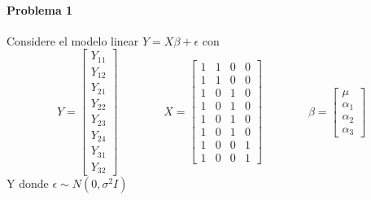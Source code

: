 \documentclass[12pt,a4paper]{report}
\author{Guadalupe Monroy}
\begin{document}



\paragraph{Problema 1} Considere el modelo linear $Y = X\beta + \epsilon$ con
$$ Y=\begin{bmatrix} Y_{11} \\ 
Y_{12} \\ Y_{21} \\ Y_{22} \\ Y_{23} \\ Y_{24} \\ Y_{31} \\ Y_{32}
\end{bmatrix} \qquad \qquad
X=\begin{bmatrix}
1 & 1 & 0 & 0 \\
1 & 1 & 0 & 0 \\
1 & 0 & 1 & 0 \\
1 & 0 & 1 & 0 \\
1 & 0 & 1 & 0 \\
1 & 0 & 1 & 0 \\
1 & 0 & 0 & 1 \\
1 & 0 & 0 & 1
\end{bmatrix} \qquad \qquad
\beta = \begin{bmatrix}
\mu \\ \alpha_1 \\ \alpha_2 \\ \alpha_3
\end{bmatrix} $$
Y donde $\epsilon \sim N(0,\sigma ^2 I)$
\end{document}
